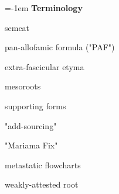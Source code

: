 {\large \parindent=-1em \textbf{Terminology}}
\vspace{0.25em}

semcat

pan-allofamic formula ("PAF")

extra-fascicular etyma

mesoroots

supporting forms

"add-sourcing"

"Mariama Fix"

metastatic flowcharts

weakly-attested root
